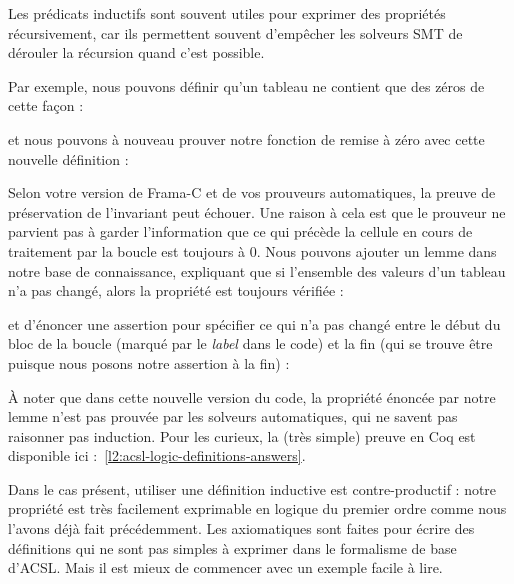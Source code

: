 

Les prédicats inductifs sont souvent utiles pour exprimer des propriétés
récursivement, car ils permettent souvent d'empêcher les solveurs SMT de
dérouler la récursion quand c'est possible.


Par exemple, nous pouvons définir qu'un tableau ne contient que des zéros de
cette façon :




et nous pouvons à nouveau prouver notre fonction de remise à zéro avec cette
nouvelle définition :






Selon votre version de Frama-C et de vos prouveurs automatiques, la preuve de
préservation de l'invariant peut échouer. Une raison à cela est que le prouveur ne
parvient pas à garder l'information que ce qui précède la cellule en cours de
traitement par la boucle est toujours à 0. Nous pouvons ajouter un lemme dans
notre base de connaissance, expliquant que si l'ensemble des valeurs d'un tableau
n'a pas changé, alors la propriété est toujours vérifiée :






et d'énoncer une assertion pour spécifier ce qui n'a pas changé entre le début
du bloc de la boucle (marqué par le \textit{label}  dans le code)
et la fin (qui se trouve être  puisque nous posons notre
assertion à la fin) :






À noter que dans cette nouvelle version du code, la propriété énoncée par notre
lemme n'est pas prouvée par les solveurs automatiques, qui ne savent pas raisonner
pas induction. Pour les curieux, la (très simple) preuve en Coq est disponible
ici :~\ref{l2:acsl-logic-definitions-answers}.



Dans le cas présent, utiliser une définition inductive est contre-productif :
notre propriété est très facilement exprimable en logique du premier ordre comme
nous l'avons déjà fait précédemment. Les axiomatiques sont faites pour écrire
des définitions qui ne sont pas simples à exprimer dans le formalisme de base
d'ACSL. Mais il est mieux de commencer avec un exemple facile à lire.




